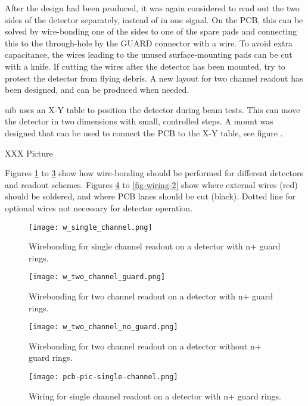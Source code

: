 \documentclass[../main/thesis.tex]{subfiles}
\begin{document}
After the design had been produced, it was again considered to read out the two sides of the detector separately, instead of in one signal. On the \gls{PCB}, this can be solved by wire-bonding one of the sides to one of the spare pads and connecting this to the through-hole by the GUARD connector with a wire. To avoid extra capacitance, the wires leading to the unused surface-mounting pads can be cut with a knife. If cutting the wires after the detector has been mounted, try to protect the detector from flying debris. A new layout for two channel readout has been designed, and can be produced when needed. 

\gls{uib} uses an X-Y table to position the detector during beam tests. This can move the detector in two dimensions with small, controlled steps. A mount was designed that can be used to connect the PCB to the X-Y table, see figure . 

XXX Picture

Figures \ref{fig-wire-1-g} to \ref{fig-wire-2} show how wire-bonding should be performed for different detectors and readout schemes. Figures \ref{fig-wiring-1-g} to \ref{fig-wiring-2} show where external wires (red) should be soldered, and where PCB lanes should be cut (black). Dotted line for optional wires not necessary for detector operation.

\begin{figure}%
	\centering
	\texttt{[image: w\_single\_channel.png]}
	\caption{Wirebonding for single channel readout on a detector with n+ guard rings.}
	\label{fig-wire-1-g} 
\end{figure}

\begin{figure}%
	\centering
	\texttt{[image: w\_two\_channel\_guard.png]}
	\caption{Wirebonding for two channel readout on a detector with n+ guard rings.}
	\label{fig-wire-2-g} 
\end{figure}

\begin{figure}%
	\centering
	\texttt{[image: w\_two\_channel\_no\_guard.png]}
	\caption{Wirebonding for two channel readout on a detector without n+ guard rings.}
	\label{fig-wire-2} 
\end{figure}

\begin{figure}%
	\centering
	\texttt{[image: pcb-pic-single-channel.png]}
	\caption{Wiring for single channel readout on a detector with n+ guard rings.}
	\label{fig-wiring-1-g} 
\end{figure}
\end{document}
